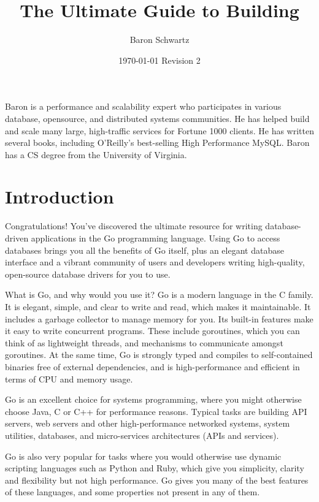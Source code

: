 \documentclass{vivid_layout}
\title{The Ultimate Guide to Building}{\fontsize{37.5pt}{15pt}\selectfont Database-Driven Apps With Go}
\date{\color{white} \today{} \textbullet{} Revision 2}
\author{Baron Schwartz}{img/baron}
\begin{document}
\maketitle		%
\begin{bio}		%
Baron is a performance and scalability expert who participates in various
database, opensource, and distributed systems communities. He has helped build
and scale many large, high-traffic services for Fortune 1000 clients. He has
written several books, including O'Reilly's best-selling High Performance MySQL.
Baron has a CS degree from the University of Virginia.
\end{bio}
\tableofcontents	%

\section{Introduction}

Congratulations! You’ve discovered the ultimate resource for writing database-driven applications in the Go programming language. Using Go to access databases brings you all the benefits of Go itself, plus an elegant database interface and a vibrant community of users and developers writing high-quality, open-source database drivers for you to use.

What is Go, and why would you use it? Go is a modern language in the C family. It is elegant, simple, and clear to write and read, which makes it maintainable. It includes a garbage collector to manage memory for you. Its built-in features make it easy to write concurrent programs. These include goroutines, which you can think of as lightweight threads, and mechanisms to communicate amongst goroutines. At the same time, Go is strongly typed and compiles to self-contained binaries free of external dependencies, and is high-performance and efficient in terms of CPU and memory usage.

Go is an excellent choice for systems programming, where you might otherwise choose Java, C or C++ for performance reasons. Typical tasks are building API servers, web servers and other high-performance networked systems, system utilities, databases, and micro-services architectures (APIs and services).

Go is also very popular for tasks where you would otherwise use dynamic scripting languages such as Python and Ruby, which give you simplicity, clarity and flexibility but not high performance. Go gives you many of the best features of these languages, and some properties not present in any of them.
\end{document}
